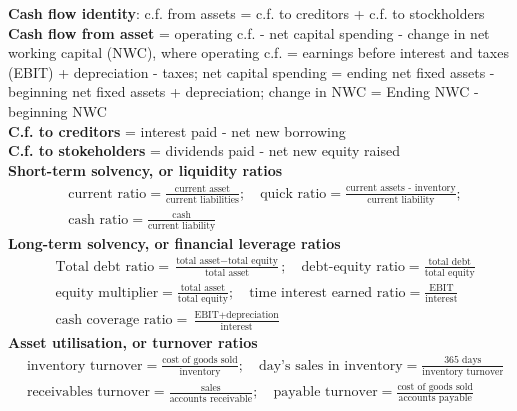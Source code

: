 \documentclass[12pt,landscape, a4paper]{article}
\theoremstyle{remark}
\begin{document}
\setlength{\abovedisplayskip}{0pt}%
\setlength{\belowdisplayskip}{0pt}%
\setlength{\abovedisplayshortskip}{0pt}%
\setlength{\belowdisplayshortskip}{0pt}%
\setlength{\jot}{0pt}%


\raggedright
\tiny
\begin{multicols*}{3}
\textbf{Cash flow identity}: c.f. from assets = c.f. to creditors + c.f. to stockholders
\\\textbf{Cash flow from asset} = operating c.f. - net capital spending - change in net working capital (NWC), where operating c.f. = earnings before interest and taxes (EBIT) + depreciation - taxes; net capital spending = ending net fixed assets - beginning net fixed assets + depreciation; change in NWC = Ending NWC - beginning NWC
\\\textbf{C.f. to creditors} = interest paid - net new borrowing
\\\textbf{C.f. to stokeholders} = dividends paid - net new equity raised\\
\textbf{Short-term solvency, or liquidity ratios}
\begin{align*}
    &\text{current ratio} = \frac{\text{current asset}}{\text{current liabilities}}; \quad \text{quick ratio} = \frac{\text{current assets - inventory}}{\text{current liability}};\\
    &\text{cash ratio} = \frac{\text{cash}}{\text{current liability}}
\end{align*}
\textbf{Long-term solvency, or financial leverage ratios}
\begin{align*}
    &\text{Total debt ratio} = \frac{\text{total asset} - \text{total equity} }{\text{total asset}}; \quad\text{debt-equity ratio} = \frac{\text{total debt}}{\text{total equity}}\\
    &\text{equity multiplier} = \frac{\text{total asset}}{\text{total equity}}; \quad \text{time interest earned ratio} = \frac{\text{EBIT}}{\text{interest}}\\
    &\text{cash coverage ratio} = \frac{\text{EBIT} + \text{depreciation}}{\text{interest}}
\end{align*}
\textbf{Asset utilisation, or turnover ratios}
\begin{align*}
    &\text{inventory turnover} = \frac{\text{cost of goods sold}}{\text{inventory}}; \quad \text{day's sales in inventory} = \frac{\text{365 days}}{\text{inventory turnover}}\\
    &\text{receivables turnover}  = \frac{\text{sales}}{\text{accounts receivable}}; \quad \text{payable turnover} = \frac{\text{cost of goods sold}}{\text{accounts payable}}\\

\end{align*}
\end{multicols*}
\end{document}
